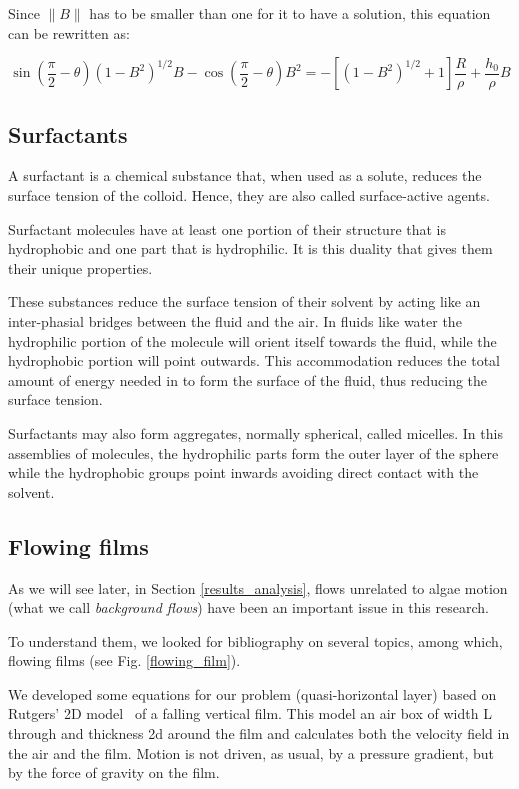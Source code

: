 Since $\|B\|$ has to be smaller than one for it to have a solution, this equation can be rewritten as:

\begin{equation}
\sin \left(\frac{\pi}{2} - \theta \right) (1 - B^2)^{1/2} B - \cos \left(\frac{\pi}{2} - \theta\right) B^2 = - [(1 - B^2)^{1/2}+1] \frac{R}{\rho} + \frac{h_0}{\rho} B
\end{equation}

\subsection{Surfactants}
\label{surfactants}

A surfactant is a chemical substance that, when used as a solute, reduces the surface tension of the colloid. Hence, they are also called surface-active agents.
 
Surfactant molecules have at least one portion of their structure that is hydrophobic and one part that is hydrophilic. It is this duality that gives them their unique properties.
 
These substances reduce the surface tension of their solvent by acting like an inter-phasial bridges between the fluid and the air. In fluids like water the hydrophilic portion of the molecule will orient itself towards the fluid, while the hydrophobic portion will point outwards. This accommodation reduces the total amount of energy needed in to form the surface of the fluid, thus reducing the surface tension.
 
Surfactants may also form aggregates, normally spherical, called micelles. In this assemblies of molecules, the hydrophilic parts form the outer layer of the sphere while the hydrophobic groups point inwards avoiding direct contact with the solvent.

\subsection{Flowing films}
\label{flowing_films}

As we will see later, in Section \ref{results_analysis}, flows unrelated to algae motion (what we call \textit{background flows}) have been an important issue in this research.

To understand them, we looked for bibliography on several topics, among which, flowing films (see Fig. \ref{flowing_film}).

We developed some equations for our problem (quasi-horizontal layer) based on Rutgers' 2D model~\cite{Rutgers1998} of a falling vertical film. This model an air box of width L through and thickness 2d around the film and calculates both the velocity field in the air and the film. Motion is not driven, as usual, by a pressure gradient, but by the force of gravity on the film.

